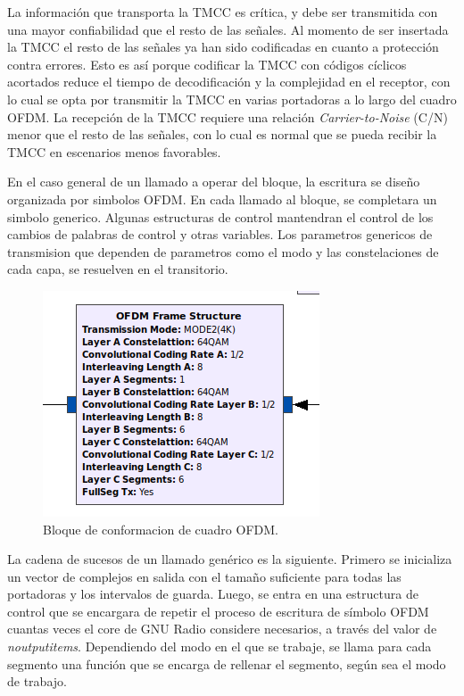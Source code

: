 La información que transporta la TMCC es crítica, y debe ser transmitida con una mayor confiabilidad que el resto de las señales. Al momento de ser insertada la TMCC el resto de las señales ya han sido codificadas en cuanto a protección contra errores. Esto es así porque codificar la TMCC con códigos cíclicos acortados reduce el tiempo de decodificación y la complejidad en el receptor, con lo cual se opta por transmitir la TMCC en varias portadoras a lo largo del cuadro OFDM. La recepción de la TMCC requiere una relación \textit{Carrier-to-Noise} (C/N) menor que el resto de las señales, con lo cual es normal que se pueda recibir la TMCC en escenarios menos favorables.


En el caso general de un llamado a operar del bloque, la escritura se diseño organizada por simbolos OFDM. En cada llamado al bloque, se completara un simbolo generico. Algunas estructuras de control mantendran el control de los cambios de palabras de control y otras variables. Los parametros genericos de transmision que dependen de parametros como el modo y las constelaciones de cada capa, se resuelven en el transitorio.

\begin{figure}[!h]
	\centering
	\includegraphics[scale=0.5]{figuras/cap05/bloque_ofdm}
	\caption{\label{f:bloque_ofdm} Bloque de conformacion de cuadro OFDM.}
\end{figure}

La cadena de sucesos de un llamado genérico es la siguiente. Primero se inicializa un vector de complejos en salida con el tamaño suficiente para todas las portadoras y los intervalos de guarda. Luego, se entra en una estructura de control que se encargara de  repetir el proceso de escritura de símbolo OFDM cuantas veces el core de GNU Radio considere necesarios, a través del valor de \textit{noutputitems}. Dependiendo del modo en el que se trabaje, se llama para cada segmento una función que se encarga de rellenar el segmento, según sea el modo de trabajo.

